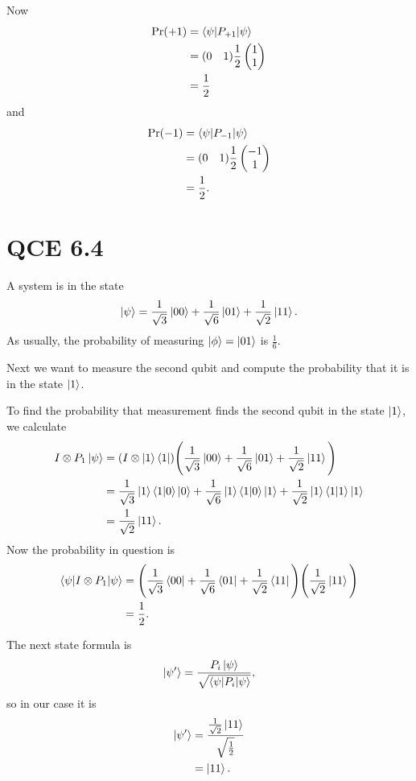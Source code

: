 \documentclass[10pt]{article}
\begin{document}
Now
\begin{align*}
\text{Pr}(+1) &= \braket{\psi | P_{+1} | \psi} \\
                    &= ( 0 \quad 1) \frac{1}{2} 
                    \begin{pmatrix}
                    1 \\
                    1
                    \end{pmatrix} \\
                    &= \frac{1}{2}
\end{align*}
and
\begin{align*}
\text{Pr}(-1) &= \braket{\psi | P_{-1} | \psi} \\
                    &= ( 0 \quad 1) \frac{1}{2} 
                    \begin{pmatrix}
                    -1 \\
                    1
                    \end{pmatrix} \\
                    &= \frac{1}{2}.
\end{align*}

\section*{QCE 6.4}
A system is in the state 
\[
\ket{\psi} = \frac{1}{\sqrt{3}} \ket{00} + \frac{1}{\sqrt{6}} \ket{01} + \frac{1}{\sqrt{2}} \ket{11}.
\]
As usually, the probability of measuring $\ket{\phi} = \ket{01}$ is $\frac{1}{6}$.

Next we want to measure the second qubit and compute the probability that it is in the state $\ket{1}$.

To find the probability that measurement finds the second qubit in the state $\ket{1}$, we calculate
\begin{align*}
I \otimes P_1 \ket{\psi} &= (I \otimes \ket{1} \bra{1}) \Bigg( \frac{1}{\sqrt{3}} \ket{00} + \frac{1}{\sqrt{6}} \ket{01} + \frac{1}{\sqrt{2}} \ket{11} \Bigg) \\
                                     &= \frac{1}{\sqrt{3}} \ket{1} \braket{1 | 0} \ket{0} + \frac{1}{\sqrt{6}} \ket{1} \braket{1|0} \ket{1} + \frac{1}{\sqrt{2}} \ket{1} \braket{1|1} \ket{1} \\
                                     &= \frac{1}{\sqrt{2}} \ket{11}.
\end{align*}
Now the probability in question is
\begin{align*}
\braket{\psi | I \otimes P_1 | \psi} &= \Bigg( \frac{1}{\sqrt{3}} \bra{00} + \frac{1}{\sqrt{6}} \bra{01} + \frac{1}{\sqrt{2}} \bra{11} \Bigg) \Bigg( \frac{1}{\sqrt{2}} \ket{11} \Bigg) \\
													   &= \frac{1}{2}.
\end{align*}

The next state formula is
\[
\ket{\psi'} = \frac{P_i\ket{\psi}}{ \sqrt{ \braket{ \psi | P_i | \psi } } },
\]
so in our case it is
\begin{align*}
\ket{\psi'} &= \frac{ \frac{1}{\sqrt{2}} \ket{11} }{ \sqrt{ \frac{1}{2}}} \\
                &= \ket{11}.
\end{align*}
\end{document}
